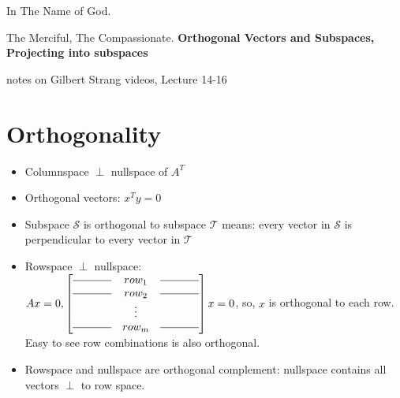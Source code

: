 \documentclass[a4paper,12pt]{article}
\begin{document}
\begin{center}
In The Name of God.

The Merciful, The Compassionate.
\vskip 1cm
{\Large\bfseries{Orthogonal Vectors and Subspaces, Projecting into subspaces}}

\vskip 0.2cm
\tiny{notes on Gilbert Strang videos, Lecture 14-16}
\end{center}

\section{Orthogonality}
\begin{itemize}
	\item Columnspace $\perp$ nullspace of $A^T$
	\item Orthogonal vectors: $x^T y = 0$
	\item Subspace $\mathcal{S}$ is orthogonal to subspace $\mathcal{T}$ means: every vector in $\mathcal{S}$ is perpendicular to every vector in $\mathcal{T}$
	\item Rowspace $\perp$ nullspace: \\
		$Ax=0, 
		\begin{bmatrix}
			\rule[.5ex]{3.5em}{0.4pt} & row_1  & \rule[.5ex]{3.5em}{0.4pt} \\
			\rule[.5ex]{3.5em}{0.4pt} & row_2  & \rule[.5ex]{3.5em}{0.4pt} \\
				      &\vdots  & 		 \\
			\rule[.5ex]{3.5em}{0.4pt} & row_m & \rule[.5ex]{3.5em}{0.4pt} \\
		\end{bmatrix} x = 0$, so, $x$ is orthogonal to each row. Easy to  see row combinations is also orthogonal.
	
	\item Rowspace and nullspace are orthogonal complement: nullspace contains all vectors $\perp$ to row space.
\end{itemize}
\end{document}
